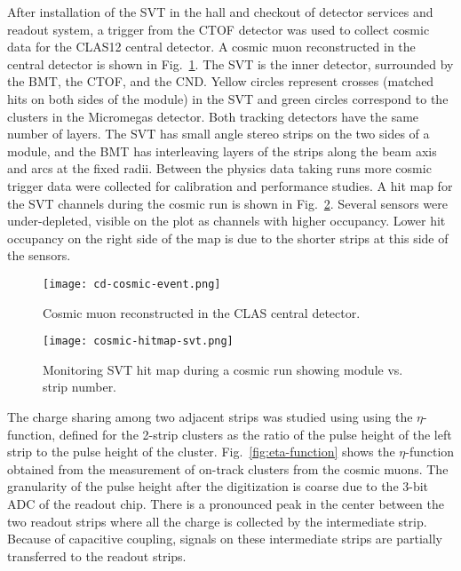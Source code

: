 After installation of the SVT in the hall and checkout of detector services and readout system, a trigger from the CTOF detector was used to collect cosmic data for the CLAS12 central detector. A cosmic muon reconstructed in the central detector is shown in Fig.~\ref{fig:cd-cosmic-event}. The SVT is the inner detector, surrounded by the BMT, the CTOF, and the CND. Yellow circles represent crosses (matched hits on both sides of the module) in the SVT and green circles correspond to the clusters in the Micromegas detector. Both tracking detectors have the same number of layers. The SVT has small angle stereo strips on the two sides of a module, and the BMT has interleaving layers of the strips along the beam axis and arcs at the fixed radii. Between the physics data taking runs more cosmic trigger data were collected for calibration and performance studies.  A hit map for the SVT channels during the cosmic run is shown in Fig.~\ref{fig:cosmic-hitmap-svt}. Several sensors were under-depleted, visible on the plot as channels with higher occupancy. Lower hit occupancy on the right side of the map is due to the shorter strips at this side of the sensors. 

\begin{figure}[hbt] 
\centering 
\texttt{[image: cd-cosmic-event.png]}
\caption{Cosmic muon reconstructed in the CLAS central detector.}
\label{fig:cd-cosmic-event}
\end{figure}

\begin{figure}[hbt] 
\centering 
\texttt{[image: cosmic-hitmap-svt.png]}
\caption{Monitoring SVT hit map during a cosmic run showing module vs. strip number.}
\label{fig:cosmic-hitmap-svt}
\end{figure}

The charge sharing among two adjacent strips was studied using using the $\eta$-function, defined for the 2-strip clusters as the ratio of the pulse height of the left strip to the pulse height of the cluster. Fig.~\ref{fig:eta-function} shows the  $\eta$-function obtained from the measurement of on-track clusters from the cosmic muons. The granularity of the pulse height after the digitization is coarse due to the 3-bit ADC of the readout chip. There is a pronounced peak in the center between the two readout strips where all the charge is collected by the intermediate strip. Because of capacitive coupling, signals on these intermediate strips are partially transferred to the readout strips.

